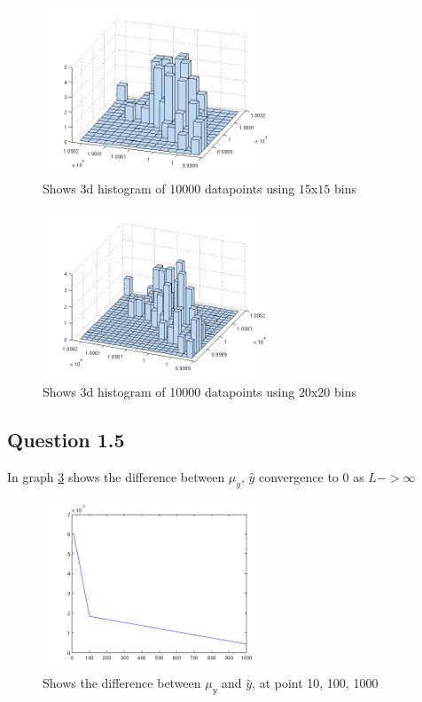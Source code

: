 \documentclass[a4paper, 10pt, final]{article}
\begin{document}
\begin{figure}[!htpb]
  \centering
  \includegraphics[width=0.6\textwidth]{images/q1_4_10000_b15}
  \caption{Shows 3d histogram of 10000 datapoints using $15$x$15$ bins}
  \label{fig:q1_4_10000_b15}
\end{figure}

\begin{figure}[!htpb]
  \centering
  \includegraphics[width=0.6\textwidth]{images/q1_4_10000_b20}
  \caption{Shows 3d histogram of 10000 datapoints using $20$x$20$ bins}
  \label{fig:q1_4_10000_b20}
\end{figure}

\subsection*{Question 1.5}
In graph \ref{fig:q5} shows the difference between $\mu _y$, $\hat{y}$ convergence to 0 as $L -> \infty$

\begin{figure}[!ht]
  \centering
  \includegraphics[width=0.6\textwidth]{images/q5_L10_L100_L1000}
  \caption{Shows the difference between $\mu _y$ and $\hat{y}$, at point 10, 100, 1000}
  \label{fig:q5}
\end{figure}
\end{document}
